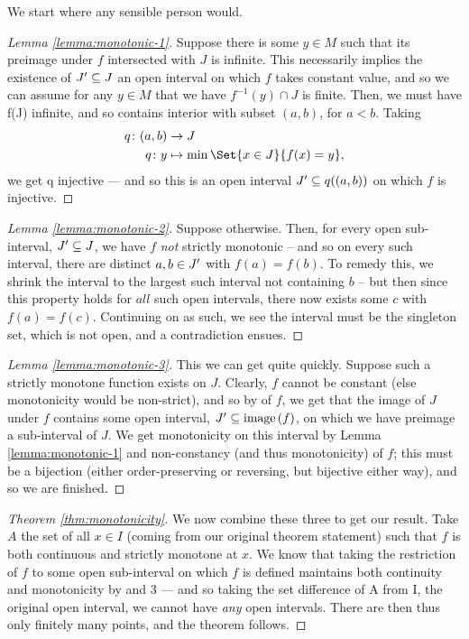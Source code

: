 We start where any sensible person would.

\begin{proof}[Lemma \ref{lemma:monotonic-1}]
  Suppose there is some $y \in M$ such that its preimage under $f$ intersected with $J$ is infinite. This necessarily implies the existence of $ J^{\prime} \subseteq J$ an open interval on which $f$ takes constant value, and so we can assume for any $y \in M$ that we have $f^{-1}(y) \cap J$ is finite. Then, we must have f(J) infinite, and so contains interior with subset $ (a, b) $, for $a < b$. Taking
  \begin{align*}
    q \colon (a, b) &\to J \\
    q \colon y &\mapsto \min{\Set{x \in J}{f(x) = y}},
  \end{align*}
  we get q injective — and so this is an open interval $ J^{\prime} \subseteq q((a, b))$ on which $f$ is injective.
\end{proof}


\begin{proof}[Lemma \ref{lemma:monotonic-2}]
  Suppose otherwise. Then, for every open sub-interval, $J^{\prime} \subseteq J$, we have $f$ \emph{not} strictly monotonic -- and so on every such interval, there are distinct $a, b \in J^{\prime}$ with $f(a) = f(b)$. To remedy this, we shrink the interval to the largest such interval not containing $b$ -- but then since this property holds for $all$ such open intervals, there now exists some $c$ with $f(a) = f(c)$. Continuing on as such, we see the interval must be the singleton set, which is not open, and a contradiction ensues. 
\end{proof}


\begin{proof}[Lemma \ref{lemma:monotonic-3}]
  This we can get quite quickly. Suppose such a strictly monotone function exists on $J$. Clearly, $f$ cannot be constant (else monotonicity would be non-strict), and so by \omy of $f$, we get that the image of $J$ under $f$ contains some open interval, $ J^{\prime} \subseteq \operatorname{image}\left(f\right)$, on which we have preimage a sub-interval of $J$. We get monotonicity on this interval by Lemma \ref{lemma:monotonic-1} and non-constancy (and thus monotonicity) of $f$; this must be a bijection (either order-preserving or reversing, but bijective either way), and so we are finished.
\end{proof}


\begin{proof}[Theorem \ref{thm:monotonicity}]
  We now combine these three \lemmas to get our result. Take $A$ the set of all $x \in I$ (coming from our original theorem statement) such that $f$ is both continuous and strictly monotone at $x$. We know that taking the restriction of $f$ to some open sub-interval on which $f$ is defined maintains both continuity and monotonicity by  and 3 — and so taking the set difference of A from I, the original open interval, we cannot have \emph{any} open intervals. There are then thus only finitely many points, and the theorem follows.
\end{proof}

